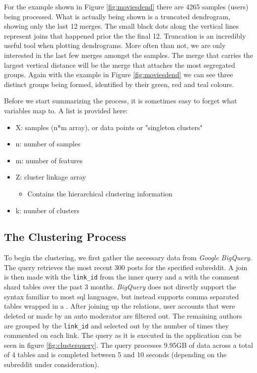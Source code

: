 \documentclass[msc,oneside]{ubcthesis}%
\begin{document}
\par
For the example shown in Figure \ref{fig:moviesdend} there are 4265 samples (users) being processed. What is actually being shown is a truncated dendrogram, showing only the last 12 merges. The small black dots along the vertical lines represent joins that happened prior the the final 12. Truncation is an incredibly useful tool when plotting dendrograms. More often than not, we are only interested in the last few merges amongst the samples. The merge that carries the largest vertical distance will be the merge that attaches the most segregated groups. Again with the example in Figure \ref{fig:moviesdend} we can see three distinct groups being formed, identified by their green, red and teal colours.
\par
Before we start summarizing the process, it is sometimes easy to forget what variables map to. A list is provided here:
\begin{itemize}
\item{X: samples (n*m array), or data points or "singleton clusters"}
\item{n: number of samples}
\item{m: number of features}
\item{Z: cluster linkage array}
	\begin{itemize}
	\item{Contains the hierarchical clustering information}
	\end{itemize}
\item{k: number of clusters}
\end{itemize}
\par

\subsection{The Clustering Process}
To begin the clustering, we first gather the necessary data from \textit{Google BigQuery}. The query retrieves the most recent 300 posts for the specified subreddit. A join is then made with the \texttt{link\_id} from the inner query and a  with the comment shard tables over the past 3 months. \textit{BigQuery} does not directly support the  syntax familiar to most sql languages, but instead supports comma separated tables wrapped in a . After joining up the relations, user accounts that were deleted or made by an auto moderator are filtered out. The remaining authors are grouped by the \texttt{link\_id} and selected out by the number of times they commented on each link. The query as it is executed in the application can be seen in figure \ref{fig:clusterquery}. The query processes 9.95GB of data across a total of 4 tables and is completed between 5 and 10 seconds (depending on the subreddit under consideration).
\end{document}
